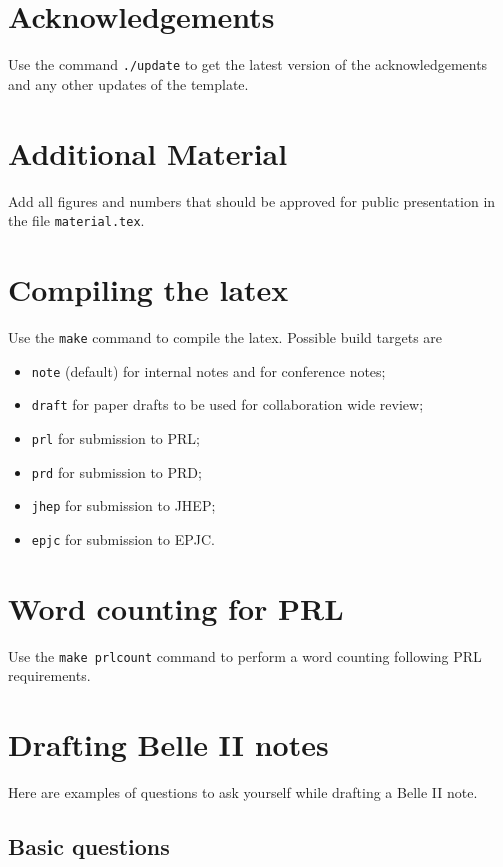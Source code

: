 \section{Acknowledgements}
Use the command \texttt{./update} to get the latest version of the acknowledgements and any other updates of the template.

\section{Additional Material}
Add all figures and numbers that should be approved for public presentation in the file \texttt{material.tex}.

\section{Compiling the latex}
Use the \texttt{make} command to compile the latex.
Possible build targets are
\begin{itemize}
\item \texttt{note} (default) for internal notes and for conference notes;
\item \texttt{draft} for paper drafts to be used for collaboration wide review;
\item \texttt{prl} for submission to PRL;
\item \texttt{prd} for submission to PRD;
\item \texttt{jhep} for submission to JHEP;
\item \texttt{epjc} for submission to EPJC.
\end{itemize}

\section{Word counting for PRL}
Use the \texttt{make prlcount} command to perform a word counting following PRL requirements.

\section{Drafting Belle II notes}
Here are examples of questions to ask yourself while drafting a Belle II note.

\subsection*{Basic questions}

